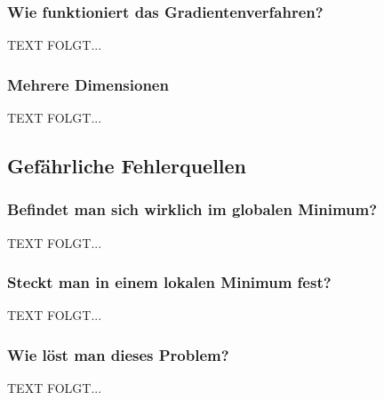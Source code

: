 \subsubsection{Wie funktioniert das Gradientenverfahren?}\label{subsec:gradientenverfahren:wie_funktioniert}
  TEXT FOLGT...

\subsubsection{Mehrere Dimensionen}\label{subsec:gradientenverfahren:mehrere_dimensionen}
  TEXT FOLGT...



\subsection{Gefährliche Fehlerquellen}\label{subsec:gradientenverfahren:fehlerquellen}
\subsubsection{Befindet man sich wirklich im globalen Minimum?}\label{subsec:gradientenverfahren:fehlerquellen_globalen_minimum}
  TEXT FOLGT...

\subsubsection{Steckt man in einem lokalen Minimum fest?}\label{subsec:gradientenverfahren:fehlerquellen_lokalen_minimum}
  TEXT FOLGT...

\subsubsection{Wie löst man dieses Problem?}\label{subsec:gradientenverfahren:fehlerquellen_problem_loesen}
  TEXT FOLGT...


